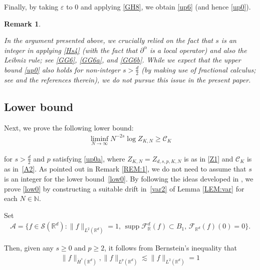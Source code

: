 \documentclass[letterpaper, 11pt,  reqno]{amsart}
\newtheorem{remark}[theorem]{Remark}
\DeclareMathOperator*{\supp}{supp}
\newcommand{\noi}{\noindent}
\newcommand{\R}{\mathbb{R}}
\newcommand{\F}{\mathcal{F}}
\newcommand{\al}{\alpha}
\newcommand{\eps}{\varepsilon}
\newcommand{\dd}{\partial}
\newcommand{\les}{\lesssim}
\renewcommand{\S}{\mathcal{S}}
\newcommand{\N}{\mathbb{N}}
\numberwithin{equation}{section}
\numberwithin{theorem}{section}
\newcommand{\CC}{\mathcal{C}}
\begin{document}
\noi
Finally, by taking $\eps$ to $0$
and applying \eqref{GH8}, 
we obtain
\eqref{up6}
(and hence \eqref{up0}).


\begin{remark}\label{REM:up1}\rm


In the argument presented above, 
we crucially relied on the fact that $s$ is an integer
in applying \eqref{Hs4} (with the fact that
$\dd^\al$ is a local operator)
and also the Leibniz rule;
see \eqref{GG6}, \eqref{GG6a}, and \eqref{GG6b}.
While we expect that the upper bound \eqref{up0}
also holds for non-integer $s > \frac d2$
(by making use of fractional calculus; see
\cite{BOZ} and the references therein), 
we do not pursue this issue
in the present paper.



\end{remark}





\subsection{Lower bound}
\label{SUBSEC:3.2}


Next,  we prove the following lower bound:
\begin{align}
\liminf_{N\to \infty}N^{-2s} \log Z_{K, N}\ge \CC_K
\label{low0}
\end{align}

\noi
for $ s > \frac d2$ and $p$ satisfying \eqref{up0a}, 
where
$Z_{K, N} = Z_{d, s, p, K, N}$
is as in \eqref{Z1} 
and $\CC_K$ is as in~\eqref{A2}.
As pointed out in Remark \ref{REM:1}, 
we do not need to assume that $s$ is an integer
for the lower bound~\eqref{low0}.
By following the ideas developed in \cite{OST}, 
we prove \eqref{low0}
by constructing a suitable drift 
in~\eqref{var2} of Lemma \ref{LEM:var}
for each $N \in \N$.






Set 
\begin{align}
 \mathcal{A}
= \big\{
f \in \S(\R^d):  
\|f\|_{L^2(\R^d)} = 1, \,
\supp \F_\R^d(f) \subset B_1, \, 
\F_{\R^d}(f) (0) = 0\big\}.
\label{AA1}
\end{align}


\noi
Then, given any $s \ge 0$ and $p \ge 2$, 
it follows from 
Bernstein's inequality that 
\begin{align}
\| f\|_{\dot H^s(\R^d)}, \|f\|_{L^p(\R^d)} \les \| f\|_{L^2(\R^d)} = 1
\label{AA2}
\end{align}
\end{document}
